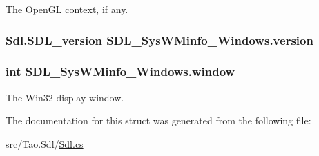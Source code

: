 The OpenGL context, if any. 

\hypertarget{struct_s_d_l___sys_w_minfo___windows_a4c0d9ab91c33f975d8823b3b4729a69e}{
\subsubsection[{version}]{\setlength{\rightskip}{0pt plus 5cm}Sdl.SDL\_\-version {\bf SDL\_\-SysWMinfo\_\-Windows.version}}}
\label{struct_s_d_l___sys_w_minfo___windows_a4c0d9ab91c33f975d8823b3b4729a69e}
\hypertarget{struct_s_d_l___sys_w_minfo___windows_a5a3997fe4f0228693a99ddc2dd6817b1}{
\subsubsection[{window}]{\setlength{\rightskip}{0pt plus 5cm}int {\bf SDL\_\-SysWMinfo\_\-Windows.window}}}
\label{struct_s_d_l___sys_w_minfo___windows_a5a3997fe4f0228693a99ddc2dd6817b1}


The Win32 display window. 



The documentation for this struct was generated from the following file:\begin{DoxyCompactItemize}
\item 
src/Tao.Sdl/\hyperlink{_sdl_8cs}{Sdl.cs}\end{DoxyCompactItemize}
